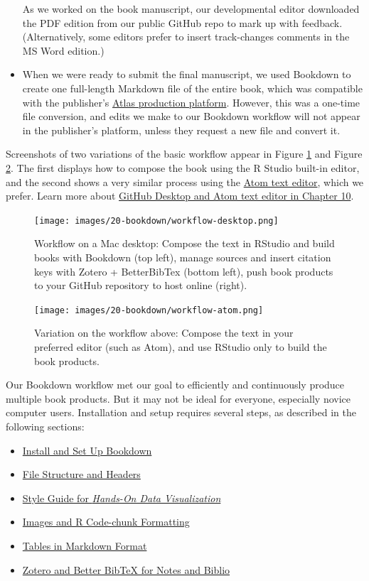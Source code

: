 \documentclass[
  english,
]{book}
\providecommand{\tightlist}{%
  \setlength{\itemsep}{0pt}\setlength{\parskip}{0pt}}
\begin{document}
\begin{itemize}
  As we worked on the book manuscript, our developmental editor downloaded the PDF edition from our public GitHub repo to mark up with feedback. (Alternatively, some editors prefer to insert track-changes comments in the MS Word edition.)
\item
  When we were ready to submit the final manuscript, we used Bookdown to create one full-length Markdown file of the entire book, which was compatible with the publisher's \href{https://docs.atlas.oreilly.com/writing_in_asciidoc.html}{Atlas production platform}. However, this was a one-time file conversion, and edits we make to our Bookdown workflow will not appear in the publisher's platform, unless they request a new file and convert it.
\end{itemize}

Screenshots of two variations of the basic workflow appear in Figure \ref{fig:workflow-desktop} and Figure \ref{fig:workflow-atom}. The first displays how to compose the book using the R Studio built-in editor, and the second shows a very similar process using the \href{https://atom.io}{Atom text editor}, which we prefer. Learn more about \href{github-desktop-atom.html}{GitHub Desktop and Atom text editor in Chapter 10}.



\begin{figure}
\centering
\texttt{[image: images/20-bookdown/workflow-desktop.png]}
\caption{\label{fig:workflow-desktop}Workflow on a Mac desktop: Compose the text in RStudio and build books with Bookdown (top left), manage sources and insert citation keys with Zotero + BetterBibTex (bottom left), push book products to your GitHub repository to host online (right).}
\end{figure}



\begin{figure}
\centering
\texttt{[image: images/20-bookdown/workflow-atom.png]}
\caption{\label{fig:workflow-atom}Variation on the workflow above: Compose the text in your preferred editor (such as Atom), and use RStudio only to build the book products.}
\end{figure}

Our Bookdown workflow met our goal to efficiently and continuously produce multiple book products. But it may not be ideal for everyone, especially novice computer users. Installation and setup requires several steps, as described in the following sections:

\begin{itemize}
\tightlist
\item
  \href{install.html}{Install and Set Up Bookdown}
\item
  \href{structure.html}{File Structure and Headers}
\item
  \href{style-guide.html}{Style Guide for \emph{Hands-On Data Visualization}}
\item
  \href{images.html}{Images and R Code-chunk Formatting}
\item
  \href{tables.html}{Tables in Markdown Format}
\item
  \href{zotero.html}{Zotero and Better BibTeX for Notes and Biblio}
\end{itemize}
\end{document}
